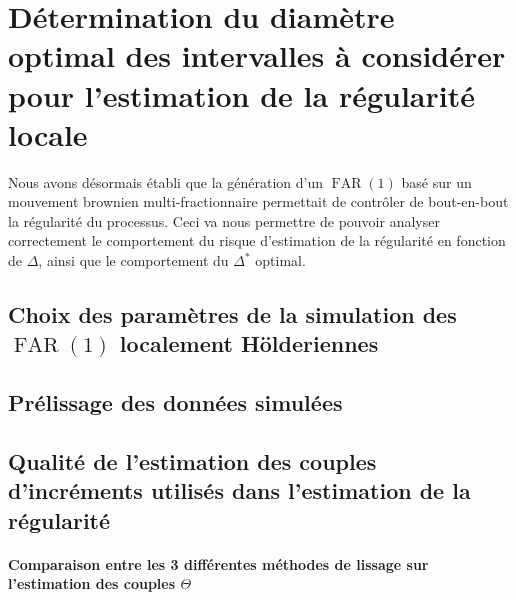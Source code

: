 \chapter{Détermination du diamètre optimal des intervalles à considérer pour l'estimation de la régularité locale }
\minitoc%


Nous avons désormais établi que la génération d'un $\operatorname{FAR}(1)$ basé sur un mouvement brownien multi-fractionnaire permettait de contrôler de bout-en-bout la régularité du processus. Ceci va nous permettre de pouvoir analyser correctement le comportement du risque d'estimation de la régularité en fonction de $\Delta$, ainsi que le comportement du $\Delta^*$ optimal.

\section{Choix des paramètres de la simulation des $\operatorname{FAR}(1)$ localement Hölderiennes}



\section{Prélissage des données simulées}




% 
% 
% 


\section{Qualité de l'estimation des couples d'incréments utilisés dans l'estimation de la régularité}



\subsubsection{Comparaison entre les 3 différentes méthodes de lissage sur l'estimation des couples $\Theta$}

